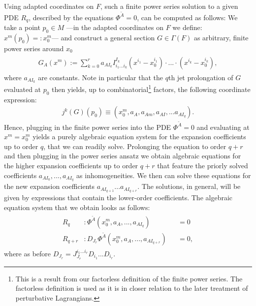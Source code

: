 Using adapted coordinates on $F$, such a finite power series solution to a given PDE $R_q$, described by the equations $\Phi^{\tilde{A}} = 0$, can be computed as follows: We take a point $p_0 \in M$ ---in the adapted coordinates on $F$ we define: $x^m(p_0) =: x_0^m$--- and construct a general section $G\in\Gamma(F)$ as arbitrary, finite power series around $x_0$
\begin{align}
\begin{aligned}
    G_A(x^m) :=  \sum_{k=0}^{r} a_{AI_k}I^{I_k}_{i_1...i_k}(x^{i_1}-x_0^{i_1}) \cdot ... \cdot (x^{i_k}- x_0^{i_k}), 
\end{aligned}
\end{align}
where $a_{AI_k}$ are constants. Note in particular that the $q$th jet prolongation of $G$ evaluated at $p_0$ then yields, up to combinatorial\footnote{This is a result from our factorless definition of the finite power series. The factorless definition is used as it is in closer relation to the later treatment of perturbative Lagrangians.} factors, the following coordinate expression:
\begin{align}
    j^k(G)(p_0) \equiv \left ( x_0^m, a_A, a_{Am}, a_{AI}, ... a_{AI_q} \right ).
\end{align}
Hence, plugging in the finite power series into the PDE $\Phi^{\tilde{A}} =0$ and evaluating at $x^m=x^m_0$ yields a purely algebraic equation system for the expansion coefficients up to order $q$, that we can readily solve. Prolonging the equation to order $q+r$ and then plugging in the power series ansatz we obtain algebraic equations for the higher expansion coefficients up to order $q+r$ that feature the priorly solved coefficients $a_{AI_0},...,a_{AI_q}$ as inhomogeneities. We then can solve these equations for the new expansion coefficients $a_{AI_{q+1}}...a_{AI_{q+r}}$. The solutions, in general, will be given by expressions that contain the lower-order coefficients.
The algebraic equation system that we obtain looks as follows:
\begin{align}
\begin{aligned}
R_q &: \Phi^{\tilde{A}}(x_0^m,a_A,...,a_{AI_q}) &&= 0 \\
R_{q+r} &:  D_{J_r}\Phi^{\tilde{A}}(x_0^m,a_A,...,a_{AI_{q+r}}) &&= 0,
\end{aligned}
\end{align}
where as before $D_{J_r} = J^{i_1...i_r}_{J_r} D_{i_1} ... D_{i_r}$.

